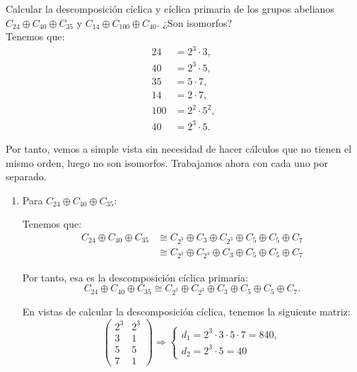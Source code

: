 \begin{ejercicio}\label{ej:7.3}
    Calcular la descomposición cíclica y cíclica primaria de los grupos abelianos $C_{24} \oplus C_{40} \oplus C_{35}$ y $C_{14} \oplus C_{100} \oplus C_{40}$. ¿Son isomorfos?\\

    Tenemos que:
    \begin{align*}
        24&=2^3 \cdot 3, \\
        40&=2^3 \cdot 5, \\
        35&=5 \cdot 7, \\
        14&=2 \cdot 7, \\
        100&=2^2 \cdot 5^2, \\
        40&=2^3 \cdot 5.
    \end{align*}

    Por tanto, vemos a simple vista sin necesidad de hacer cálculos que no tienen el mismo orden, luego no son isomorfos.
    Trabajamos ahora con cada uno por separado.
    \begin{enumerate}
        \item Para $C_{24} \oplus C_{40} \oplus C_{35}$:
        
        Tenemos que:
        \begin{align*}
            C_{24} \oplus C_{40} \oplus C_{35} &\cong C_{2^3} \oplus C_3 \oplus C_{2^3} \oplus C_5 \oplus C_{5} \oplus C_7 \\
            &\cong C_{2^3} \oplus C_{2^3} \oplus C_3 \oplus C_5 \oplus C_5 \oplus C_7
        \end{align*}

        Por tanto, esa es la descomposición cíclica primaria:
        \begin{equation*}
            C_{24} \oplus C_{40} \oplus C_{35} \cong C_{2^3} \oplus C_{2^3} \oplus C_3 \oplus C_5 \oplus C_5 \oplus C_7.
        \end{equation*}

        En vistas de calcular la descomposición cíclica, tenemos la siguiente matriz:
        \begin{equation*}
            \begin{pmatrix}
                2^3 & 2^3\\
                3 & 1\\
                5 & 5\\
                7 & 1
            \end{pmatrix}
            \Longrightarrow
            \left\{
                \begin{array}{l}
                    d_1 = 2^3\cdot 3\cdot 5\cdot 7 = 840, \\
                    d_2 = 2^3\cdot 5 = 40
                \end{array}
            \right.
        \end{equation*}


\end{enumerate}
\end{ejercicio}
